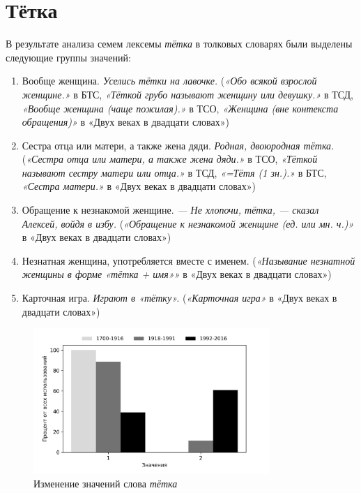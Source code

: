 \section*{Тётка}

В результате анализа семем лексемы \textit{тётка} в толковых словарях были выделены следующие группы значений:

\begin{enumerate}
    \item Вообще женщина. \textit{Уселись тётки на лавочке.}
(\textit{«Обо всякой взрослой женщине.»} в БТС,
\textit{«Тёткой грубо называют женщину или девушку.»} в ТСД,
\textit{«Вообще женщина (чаще пожилая).»} в ТСО,
\textit{«Женщина (вне контекста обращения)»} в «Двух веках в двадцати словах»)

    \item Сестра отца или матери, а также жена дяди.  \textit{Родная, двоюродная тётка.}
(\textit{«Сестра отца или матери, а также жена дяди.»} в ТСО,
\textit{«Тёткой называют сестру матери или отца.»} в ТСД,
\textit{«=Тётя (1 зн.).»} в БТС,
\textit{«Сестра матери.»} в «Двух веках в двадцати словах»)

    \item Обращение к незнакомой женщине. \textit{— Не хлопочи, тётка, — сказал Алексей, войдя в избу.}
(\textit{«Обращение к незнакомой женщине (ед. или мн. ч.)»} в «Двух веках в двадцати словах»)

    \item Незнатная женщина, употребляется вместе с именем.
(\textit{«Называние незнатной женщины в форме «тётка + имя»»} в «Двух веках в двадцати словах»)
%
    \item Карточная игра. \textit{Играют в «тётку».}
(\textit{«Карточная игра»} в «Двух веках в двадцати словах»)
\end{enumerate}

\begin{figure}[H]
	\centering
	\includegraphics[width=0.8\textwidth]{img/visualizations/tetka_minimal}
	\caption{Изменение значений слова \textit{тётка}}
	\label{fig:Тётка}
\end{figure}

